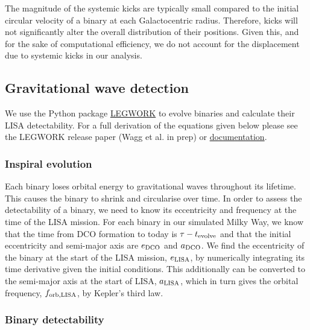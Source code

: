 The magnitude of the systemic kicks are typically small compared to the initial circular velocity of a binary at each Galactocentric radius. Therefore, kicks will not significantly alter the overall distribution of their positions. Given this, and for the sake of computational efficiency, we do not account for the displacement due to systemic kicks in our analysis.

\subsection{Gravitational wave detection}\label{sec:gw_detection}
We use the Python package \href{https://legwork.readthedocs.io/en/latest/}{LEGWORK} to evolve binaries and calculate their LISA detectability. For a full derivation of the equations given below please see the LEGWORK release paper (Wagg et al. in prep) or \href{https://legwork.readthedocs.io/en/latest/notebooks/Derivations.html}{documentation}.

\subsubsection{Inspiral evolution}

Each binary loses orbital energy to gravitational waves throughout its lifetime. This causes the binary to shrink and circularise over time. In order to assess the detectability of a binary, we need to know its eccentricity and frequency at the time of the LISA mission. For each binary in our simulated Milky Way, we know that the time from DCO formation to today is $\tau - t_{\rm evolve}$ and that the initial eccentricity and semi-major axis are $e_{\rm DCO}$ and $a_{\rm DCO}$. We find the eccentricity of the binary at the start of the LISA mission, $e_{\rm LISA}$, by numerically integrating its time derivative \citep[][Eq. 5.13]{Peters+1964} given the initial conditions. This additionally can be converted to the semi-major axis at the start of LISA, $a_{\rm LISA} $\citep[][Eq. 5.11]{Peters+1964}, which in turn gives the orbital frequency, $f_{\rm orb, LISA}$, by Kepler's third law.

\subsubsection{Binary detectability}

